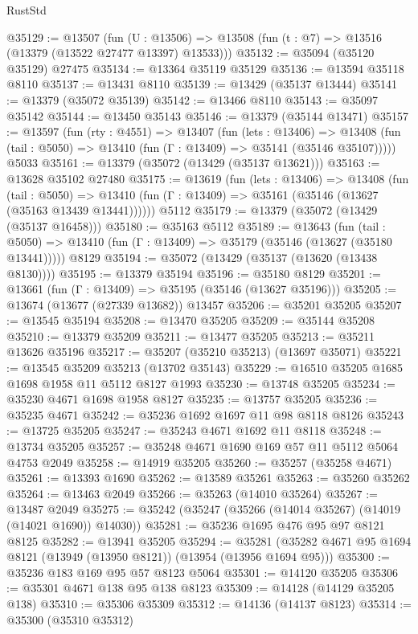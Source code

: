 \begin{lexlean}{RustStd}
\begin{coremodule}
@35129 := @13507
    (fun (U : @13506) => @13508 (fun (t : @7) => @13516 (@13379 (@13522 @27477 @13397) @13533)))
@35132 := @35094 (@35120 @35129) @27475
@35134 := @13364 @35119 @35129
@35136 := @13594 @35118 @8110
@35137 := @13431 @8110
@35139 := @13429 (@35137 @13444)
@35141 := @13379 (@35072 @35139)
@35142 := @13466 @8110
@35143 := @35097 @35142
@35144 := @13450 @35143
@35146 := @13379 (@35144 @13471)
@35157 := @13597
    (fun (rty : @4551) =>
    @13407
      (fun (lets : @13406) =>
      @13408 (fun (tail : @5050) => @13410 (fun (Γ : @13409) => @35141 (@35146 @35107)))))
    @5033
@35161 := @13379 (@35072 (@13429 (@35137 @13621)))
@35163 := @13628 @35102 @27480
@35175 := @13619
    (fun (lets : @13406) =>
    @13408
      (fun (tail : @5050) =>
      @13410 (fun (Γ : @13409) => @35161 (@35146 (@13627 (@35163 @13439 @13441))))))
    @5112
@35179 := @13379 (@35072 (@13429 (@35137 @16458)))
@35180 := @35163 @5112
@35189 := @13643
    (fun (tail : @5050) => @13410 (fun (Γ : @13409) => @35179 (@35146 (@13627 (@35180 @13441)))))
    @8129
@35194 := @35072 (@13429 (@35137 (@13620 (@13438 @8130))))
@35195 := @13379 @35194
@35196 := @35180 @8129
@35201 := @13661 (fun (Γ : @13409) => @35195 (@35146 (@13627 @35196)))
@35205 := @13674 (@13677 (@27339 @13682)) @13457
@35206 := @35201 @35205
@35207 := @13545 @35194
@35208 := @13470 @35205
@35209 := @35144 @35208
@35210 := @13379 @35209
@35211 := @13477 @35205
@35213 := @35211 @13626 @35196
@35217 := @35207 (@35210 @35213) (@13697 @35071)
@35221 := @13545 @35209 @35213 (@13702 @35143)
@35229 := @16510 @35205 @1685 @1698 @1958 @11 @5112 @8127 @1993
@35230 := @13748 @35205
@35234 := @35230 @4671 @1698 @1958 @8127
@35235 := @13757 @35205
@35236 := @35235 @4671
@35242 := @35236 @1692 @1697 @11 @98 @8118 @8126
@35243 := @13725 @35205
@35247 := @35243 @4671 @1692 @11 @8118
@35248 := @13734 @35205
@35257 := @35248 @4671 @1690 @169 @57 @11 @5112 @5064 @4753 @2049
@35258 := @14919 @35205
@35260 := @35257 (@35258 @4671)
@35261 := @13393 @1690
@35262 := @13589 @35261
@35263 := @35260 @35262
@35264 := @13463 @2049
@35266 := @35263 (@14010 @35264)
@35267 := @13487 @2049
@35275 := @35242 (@35247 (@35266 (@14014 @35267) (@14019 (@14021 @1690)) @14030))
@35281 := @35236 @1695 @476 @95 @97 @8121 @8125
@35282 := @13941 @35205
@35294 := @35281 (@35282 @4671 @95 @1694 @8121 (@13949 (@13950 @8121)) (@13954 (@13956 @1694 @95)))
@35300 := @35236 @183 @169 @95 @57 @8123 @5064
@35301 := @14120 @35205
@35306 := @35301 @4671 @138 @95 @138 @8123
@35309 := @14128 (@14129 @35205 @138)
@35310 := @35306 @35309
@35312 := @14136 (@14137 @8123)
@35314 := @35300 (@35310 @35312)

\end{coremodule}
\end{lexlean}
